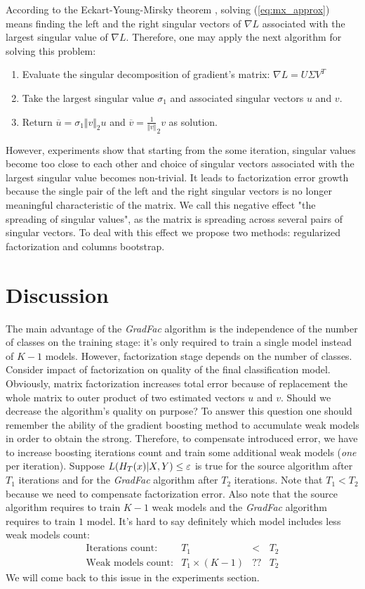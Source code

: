 \documentclass{article}
\begin{document}
According to the Eckart-Young-Mirsky theorem \cite{Eckart1936}, solving (\ref{eq:mx_approx}) means finding the left and the right singular vectors of $\nabla L$ associated with the largest singular value of $\nabla L$. Therefore, one may apply the next algorithm for solving this problem: 
\begin{enumerate}
	\item Evaluate the singular decomposition of gradient's matrix: $\nabla L = U \Sigma V^T$
	\item Take the largest singular value $\sigma_{1}$ and associated singular vectors $u$ and $v$.
	\item Return $\overline{u}={\sigma_{1}}{\Vert v \Vert}_{2}u$ and $\overline{v}=\frac{1}{\Vert v \Vert}_{2}v$ as solution.
\end{enumerate}
However, experiments show that starting from the some iteration, singular values become too close to each other and choice of singular vectors associated with the largest singular value becomes non-trivial. It leads to factorization error growth because the single pair of the left and the right singular vectors is no longer meaningful characteristic of the matrix. We call this negative effect "the spreading of singular values", as the matrix is spreading across several pairs of singular vectors.
To deal with this effect we propose two methods: regularized factorization and columns bootstrap.


\section{Discussion}
The main advantage of the \emph{GradFac} algorithm is the independence of the number of classes on the training stage: it's only required to train a single model instead of $K-1$ models. However, factorization stage depends on the number of classes. 
Consider impact of factorization on quality of the final classification model. Obviously, matrix factorization increases total error because of replacement the whole matrix to outer product of two estimated vectors $u$ and $v$. Should we decrease the algorithm's quality on purpose? To answer this question one should remember the ability of the gradient boosting method to accumulate weak models in order to obtain the strong. Therefore, to compensate introduced error, we have to increase boosting iterations count and train some additional weak models (\emph{one} per iteration). 
Suppose $L(H_{T}(x) \arrowvert X,Y) \le \varepsilon$ is true for the source algorithm after $T_{1}$ iterations and for the \emph{GradFac} algorithm after $T_{2}$ iterations. Note that $T_{1}<T_{2}$ because we need to compensate factorization error. Also note that the source algorithm requires to train $K-1$ weak models and the \emph{GradFac} algorithm requires to train $1$ model. It's hard to say definitely which model includes less weak models count: 
\[
\begin{array}{rccc}
	\text{Iterations count:}	& T_{1} 				& <		& T_{2} \\
	\text{Weak models count:}	& T_{1}\times(K-1) 		& ??	& T_{2}
\end{array}
\]
We will come back to this issue in the experiments section.
\end{document}
